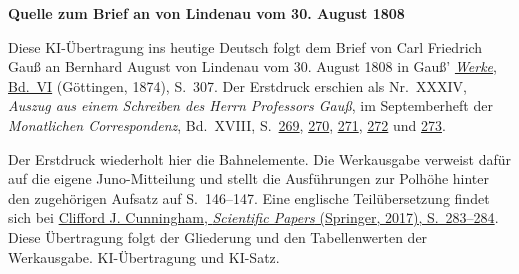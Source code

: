 \clearpage\thispagestyle{empty}
\begin{center}\textbf{Quelle zum Brief an von Lindenau vom 30. August 1808}\end{center}
\noindent Diese KI-Übertragung ins heutige Deutsch folgt dem Brief von Carl Friedrich Gauß an Bernhard August von Lindenau vom 30. August 1808 in Gauß’ \href{https://gdz.sub.uni-goettingen.de/id/PPN236007467}{\textit{Werke}, Bd.~VI} (Göttingen, 1874), S.~307. Der Erstdruck erschien als Nr.~XXXIV, \textit{Auszug aus einem Schreiben des Herrn Professors Gauß}, im Septemberheft der \textit{Monatlichen Correspondenz}, Bd.~XVIII, S.~\href{https://www.digitale-sammlungen.de/en/view/bsb10538609?page=291}{269}, \href{https://www.digitale-sammlungen.de/en/view/bsb10538609?page=292}{270}, \href{https://www.digitale-sammlungen.de/en/view/bsb10538609?page=293}{271}, \href{https://www.digitale-sammlungen.de/en/view/bsb10538609?page=294}{272} und \href{https://www.digitale-sammlungen.de/en/view/bsb10538609?page=295}{273}.
\par\medskip
Der Erstdruck wiederholt hier die Bahnelemente. Die Werkausgabe verweist dafür auf die eigene Juno-Mitteilung und stellt die Ausführungen zur Polhöhe hinter den zugehörigen Aufsatz auf S.~146--147. Eine englische Teilübersetzung findet sich bei \href{https://doi.org/10.1007/978-3-319-58118-7_12}{Clifford J. Cunningham, \textit{Scientific Papers} (Springer, 2017), S.~283--284}. Diese Übertragung folgt der Gliederung und den Tabellenwerten der Werkausgabe. KI-Übertragung und KI-Satz.
\clearpage
